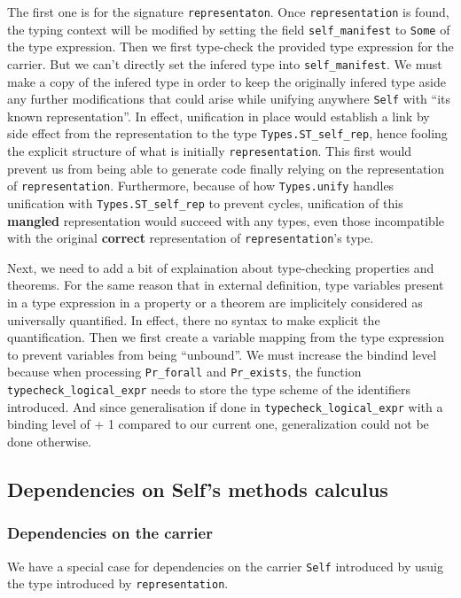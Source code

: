 The first one is for the signature {\tt representaton}. Once
{\tt representation} is found, the typing context will be modified by
setting the field {\tt self\_manifest} to {\tt Some} of the type
expression. Then we first type-check the provided type expression for
the carrier. But we can't directly set the infered type into
{\tt self\_manifest}. We must make a copy of the infered type in order
to keep the originally infered type aside any further modifications that
could arise while unifying anywhere {\tt Self} with ``its known
representation''. In effect, unification in place would establish a
link by side effect from the representation to the type
{\tt Types.ST\_self\_rep}, hence fooling the explicit structure of
what is initially {\tt representation}. This first would prevent us
from being able to generate code finally relying on the representation
of {\tt representation}. Furthermore, because of how {\tt Types.unify}
handles unification with {\tt Types.ST\_self\_rep} to prevent cycles,
unification of this {\bf mangled} representation would succeed with
any types, even those incompatible with the original {\bf correct}
representation of {\tt representation}'s type.

\medskip
Next, we need to add a bit of explaination about type-checking
properties and theorems. For the same reason that in external
definition, type variables present in a type expression in a property
or a theorem are implicitely considered as universally quantified. In
effect, there no syntax to make explicit the quantification. Then we
first create a variable mapping from the type expression to prevent
variables from being ``unbound''. We must increase the bindind level
because when processing {\tt Pr\_forall} and {\tt Pr\_exists}, the
function {\tt typecheck\_logical\_expr} needs to store the type scheme
of the identifiers introduced. And since generalisation if done in
{\tt typecheck\_logical\_expr} with a binding level of + 1 compared to
our current one, generalization could not be done otherwise.


\subsection{Dependencies on Self's methods calculus}
\label{deps-on-self-methods}


\subsubsection{Dependencies on the carrier}
\label{deps-on-carrier}
We have a special case for dependencies on the carrier {\tt Self}
introduced by usuig the type introduced by {\tt representation}.

